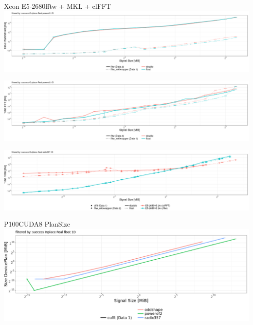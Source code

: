 \documentclass[t,11pt,hyperref={
  pdftitle = {gearshifft},
  pdfsubject = {gearshifft},
  pdfborder={0 0 0},
  colorlinks=true,
  urlcolor=red,
  citecolor=red,
  linkcolor=red,
  pdfauthor={Peter Steinbach, Matthias Werner}
  }
]{beamer}
\begin{document}
\begin{frame}{Xeon E5-2680}{fftw + MKL + clFFT}
\vspace{-0.5em} \hspace*{-2em}  \includegraphics[width=1.15\textwidth]{fftw-mkl.png}
  
\vspace{-2.1em} \hspace*{-2em}  \includegraphics[width=1.15\textwidth]{fftw-mkl-fft.png}

\vspace{-0.1em} \hspace*{-2em}  \includegraphics[width=1.15\textwidth]{clfft-mkl.png}
\end{frame}

\begin{frame}{P100}{CUDA8 PlanSize}
\centering
\hspace*{-2em}  \includegraphics[width=1.1\textwidth]{p100-cuda8-kind-plansize.png}
\end{frame}
\end{document}
